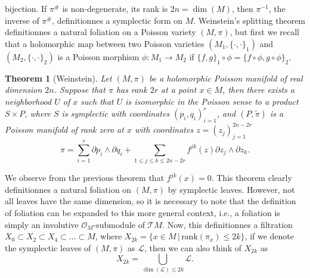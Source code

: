 \documentclass[12pt,twoside,a4paper]{report}
\newtheorem{theorem}{Theorem}[section]
\newcommand{\osheaf}{\ensuremath{\mathcal O }}
\begin{document}
bijection. If $\pi^{\#}$ is non-degenerate, its rank is $2n=\dim(M)$, then $\pi^{-1}$, the inverse of $\pi^{\#}$, definitionnes a symplectic form
on $M$. Weinstein's splitting theorem definitionnes a natural foliation on a Poisson variety $(M,\pi)$, but first
we recall that a holomorphic map between two Poisson varieties $(M_1,\{\cdot,\cdot\}_1)$ and $(M_2,\{\cdot,\cdot\}_2)$ is a Poisson morphism
$\phi:M_1\rightarrow M_2$ if $\{f,g\}_1\circ\phi=\{f\circ\phi,g\circ\phi\}_2$.
\begin{theorem}[Weinstein]\label{weins}
        Let $(M,\pi)$ be a holomorphic Poisson manifold of real dimension $2n$. Suppose that $\pi$ has rank $2r$ at a point $x\in M$,
        then there exists a neighborhood $U$ of $x$ such that $U$ is isomorphic in the Poisson sense to a product $S\times P$, where $S$ is
        symplectic with coordinates $(p_i,q_i)_{i=1}^r$, and $(P,\tilde{\pi})$ is a Poisson manifold of rank zero at $x$
        with coordinates $z=(z_j)_{j=1}^{2n-2r}$
        \[
                \pi=\sum_{i=1}^r \partial{p_i}\wedge\partial{q_i}+\sum_{1\leq j\leq k\leq 2n-2r} f^{jk}(z)\partial{z_j}\wedge\partial{z_k}.
        \]
\end{theorem}
\noindent We observe from the previous theorem that $f^{jk}(x)=0$. This theorem clearly definitionnes a natural foliation on $(M,\pi)$ by
symplectic leaves. However, not all leaves have the same dimension, so it is necessary to note that the definition of foliation
can be expanded to this more general context, i.e., a foliation is simply an involutive $\osheaf_M$-submodule of $\mathcal{T}M$.
Now, this definitionnes a filtration $X_0\subset X_2\subset X_4\subset\dots\subset M$, where $X_{2k}=\{x\in M\,|\,\textrm{rank}(\pi_x)\leq 2k\}$,
if we denote the symplectic leaves of $(M,\pi)$ as $\mathcal{L}$, then we can also think of $X_{2k}$ as
$$
X_{2k}=\bigcup_{\dim(\mathcal{L})\leq 2k}\mathcal{L}.
$$
\end{document}
